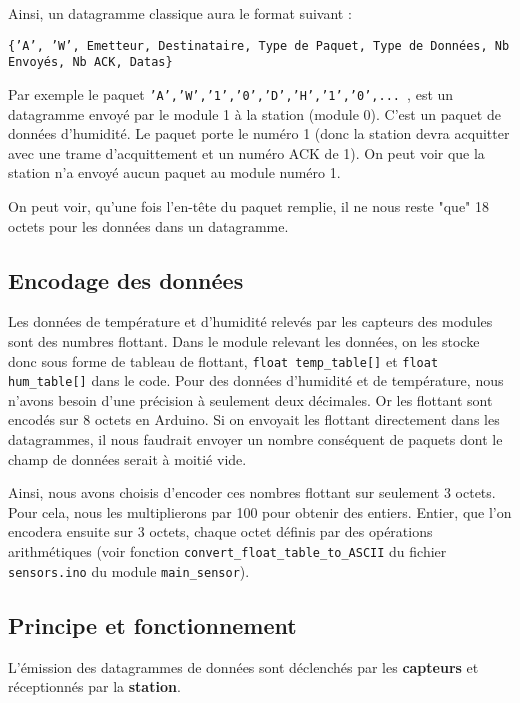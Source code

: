 \documentclass[a4paper]{article}
\begin{document}
Ainsi, un datagramme classique aura le format suivant : 
    \begin{center}
        \texttt{\{'A', 'W', Emetteur, Destinataire, Type de Paquet, Type de Données, Nb Envoyés, Nb ACK, Datas\}}
    \end{center}
Par exemple le paquet \texttt{'A','W','1','0','D','H','1','0',... }, est un datagramme envoyé 
par le module 1 à la station (module 0). C'est un paquet de données d'humidité. Le paquet porte le numéro 1 (donc la station
devra acquitter avec une trame d'acquittement et un numéro ACK de 1). On peut voir que la station n'a envoyé aucun paquet au 
module numéro 1. 

On peut voir, qu'une fois l'en-tête du paquet remplie, il ne nous reste "que" 18 octets pour les données dans un datagramme. 

\subsection{Encodage des données}

Les données de température et d'humidité relevés par les capteurs des modules sont des numbres flottant. 
Dans le module relevant les données, on les stocke donc sous forme de tableau de flottant, \texttt{float temp\_table[]}
et \texttt{float hum\_table[]} dans le code. 
Pour des données d'humidité et de température, nous n'avons besoin d'une précision à seulement deux décimales. 
Or les flottant sont encodés sur 8 octets en Arduino. Si on envoyait les flottant directement dans les datagrammes, 
il nous faudrait envoyer un nombre conséquent de paquets dont le champ de données serait à moitié vide. 

Ainsi, nous avons choisis d'encoder ces nombres flottant sur seulement 3 octets. Pour cela, nous les multiplierons 
par 100 pour obtenir des entiers. Entier, que l'on encodera ensuite sur 3 octets, chaque octet définis par des opérations 
arithmétiques (voir fonction \texttt{convert\_float\_table\_to\_ASCII} du fichier \texttt{sensors.ino} du module \texttt{main\_sensor}). 

\subsection{Principe et fonctionnement}

L'émission des datagrammes de données sont déclenchés par les \textbf{capteurs} et réceptionnés par la \textbf{station}. 

\vspace{0.3cm}
\end{document}
